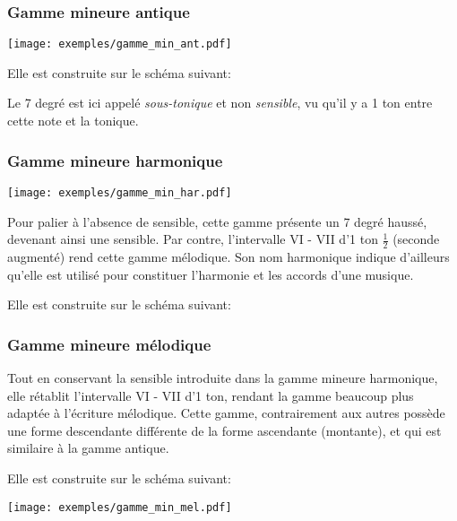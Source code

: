 \documentclass[11pt,a4paper]{scrreprt}
\begin{document}
\subsubsection{Gamme mineure antique\label{min_ant}}
\begin{center}
\texttt{[image: exemples/gamme\_min\_ant.pdf]}
\end{center}

Elle est construite sur le schéma suivant: 
\begin{center}
\end{center}
Le 7\ieme{} degré est ici appelé \emph{sous-tonique} et non \emph{sensible}, vu qu'il y a 1 ton entre cette note et la tonique.

\subsubsection{Gamme mineure harmonique}
\begin{center}
\texttt{[image: exemples/gamme\_min\_har.pdf]}
\end{center}

Pour palier à l'absence de sensible, cette gamme présente un 7\ieme{} degré haussé, devenant ainsi une sensible. Par contre, l'intervalle VI - VII d'1 ton $\frac1 2$ (seconde augmenté) rend cette gamme mélodique. Son nom  \og harmonique \fg{} indique d'ailleurs qu'elle est utilisé pour constituer l'harmonie et les accords d'une musique.

Elle est construite sur le schéma suivant: 
\begin{center}
\end{center}

\subsubsection{Gamme mineure mélodique}
Tout en conservant la sensible introduite dans la gamme mineure harmonique, elle rétablit l'intervalle VI - VII d'1 ton, rendant la gamme beaucoup plus adaptée à l'écriture mélodique. Cette gamme, contrairement aux autres possède une forme descendante différente de la forme ascendante (montante), et qui est similaire à la gamme antique.

Elle est construite sur le schéma suivant: 
\begin{center}
\end{center}
\begin{center}
\texttt{[image: exemples/gamme\_min\_mel.pdf]}
\end{center}
\end{document}
